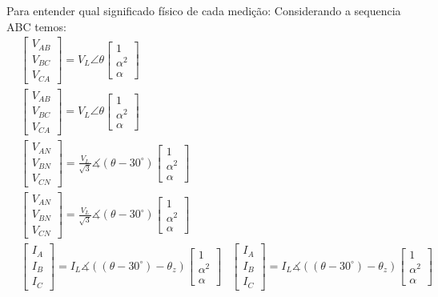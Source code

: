 \documentclass[a4paper, 12pt]{article}
\begin{document}
	Para entender qual significado físico de cada medição:
	Considerando a sequencia ABC temos:
	\[ \begin{split}
		&\begin{bmatrix} V_{AB}\\ V_{BC}\\ V_{CA} \end{bmatrix} = V_L \angle \theta \begin{bmatrix} 1\\  \alpha^2\\  \alpha \end{bmatrix}\\
		&\begin{bmatrix} V_{AB}\\ V_{BC}\\ V_{CA} \end{bmatrix} = V_L \angle \theta \begin{bmatrix} 1\\  \alpha^2\\  \alpha \end{bmatrix}\\
		&\begin{bmatrix} V_{AN}\\ V_{BN}\\ V_{CN} \end{bmatrix} = \frac{V_L}{\sqrt{3}} \measuredangle{( \theta-30^\circ)} \begin{bmatrix} 1\\  \alpha^2\\  \alpha \end{bmatrix} \\
		&\begin{bmatrix} V_{AN}\\ V_{BN}\\ V_{CN} \end{bmatrix} = \frac{V_L}{\sqrt{3}} \measuredangle{( \theta-30^\circ)} \begin{bmatrix} 1\\  \alpha^2\\  \alpha \end{bmatrix} \\
		&\begin{bmatrix} I_{A}\\ I_{B}\\ I_{C} \end{bmatrix} = I_L\measuredangle{(( \theta-30^\circ) - \theta_z)} \begin{bmatrix} 1\\  \alpha^2\\  \alpha \end{bmatrix}
		&\begin{bmatrix} I_{A}\\ I_{B}\\ I_{C} \end{bmatrix} = I_L\measuredangle{(( \theta-30^\circ) - \theta_z)} \begin{bmatrix} 1\\  \alpha^2\\  \alpha \end{bmatrix}
	\end{split}
	\]
	
\end{document}
